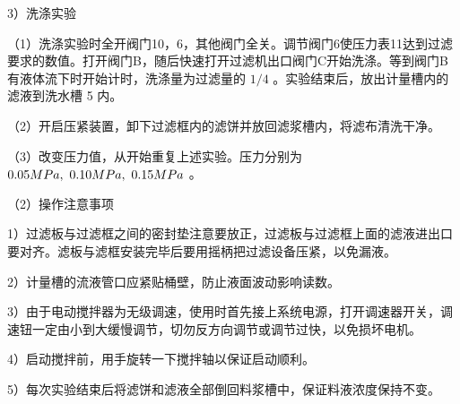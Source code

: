 \documentclass[
]{article}
\begin{document}
3）洗涤实验

（1）洗涤实验时全开阀门10，6，其他阀门全关。调节阀门6使压力表11达到过滤要求的数值。打开阀门B，随后快速打开过滤机出口阀门C开始洗涤。等到阀门B有液体流下时开始计时，洗涤量为过滤量的 $1 / 4$ 。实验结束后，放出计量槽内的滤液到洗水槽 5 内。

（2）开启压紧装置，卸下过滤框内的滤饼并放回滤浆槽内，将滤布清洗干净。

（3）改变压力值，从开始重复上述实验。压力分别为 $0.05 MPa, ~ 0.10 MPa, \\~ 0.15 MPa$ 。

（2）操作注意事项

1）过滤板与过滤框之间的密封垫注意要放正，过滤板与过滤框上面的滤液进出口要对齐。滤板与滤框安装完毕后要用摇柄把过滤设备压紧，以免漏液。

2）计量槽的流液管口应紧贴桶壁，防止液面波动影响读数。

3）由于电动搅拌器为无级调速，使用时首先接上系统电源，打开调速器开关，调速钮一定由小到大缓慢调节，切勿反方向调节或调节过快，以免损坏电机。

4）启动搅拌前，用手旋转一下搅拌轴以保证启动顺利。

5）每次实验结束后将滤饼和滤液全部倒回料浆槽中，保证料液浓度保持不变。
\end{document}
